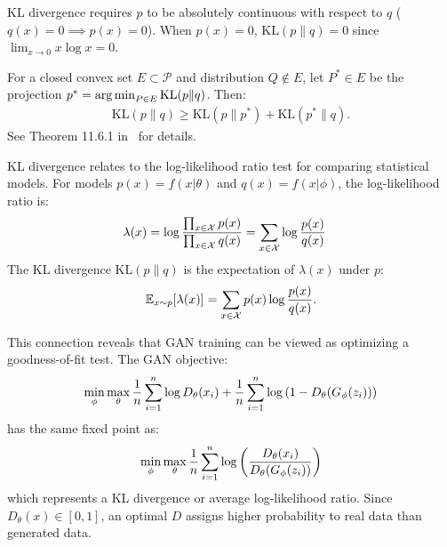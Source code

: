 \begin{remark}
  KL divergence requires $p$ to be absolutely continuous with respect to $q$ ($q(x) = 0 \implies p(x) = 0$). When $p(x) = 0$, $\text{KL}(p \| q) = 0$ since $\lim_{x \to 0} x\log{x} = 0$.
\end{remark}

\begin{theorem}
  For a closed convex set $E \subset \mathcal{P}$ and distribution $Q \not \in E$, let $P^* \in E$ be the projection $p^* = \operatorname*{arg\,min}_{P \in E} \text{KL}(p \| q)$. Then:
  \begin{align}
   \text{KL}(p \| q) \geq \text{KL}(p \| p^*) + \text{KL}(p^* \| q).
  \end{align}
  See Theorem 11.6.1 in~\cite{ref:cover-thomas} for details.
\end{theorem}

\begin{remark}
  KL divergence relates to the log-likelihood ratio test for comparing statistical models. For models $p(x) = f(x|\theta)$ and $q(x) = f(x|\phi)$, the log-likelihood ratio is:
  \begin{align}
    \lambda(x) & = \log{\prod_{x \in \mathcal{X}} p(x) \over \prod_{x \in \mathcal{X}} q(x)} = \sum_{x \in \mathcal{X}} \log {p(x) \over q(x)}
  \end{align}
  The KL divergence $\text{KL}(p \| q)$ is the expectation of $\lambda(x)$ under $p$:
  \begin{align}
    \mathbb{E}_{x \sim p}[\lambda(x)] = \sum_{x \in \mathcal{X}} p(x)\log {p(x) \over q(x)}.
  \end{align}
\end{remark}

This connection reveals that GAN training can be viewed as optimizing a goodness-of-fit test. The GAN objective:
\begin{align}
  \min_\phi\max_\theta{1 \over n} \sum_{i=1}^n \log{D_\theta(x_i)} + {1 \over n} \sum_{i=1}^n\log{(1 - D_\theta(G_\phi(z_i)))}
\end{align}
has the same fixed point as:
\begin{align}
  \min_\phi\max_\theta{1 \over n} \sum_{i=1}^n \log{\left({D_\theta(x_i) \over D_\theta(G_\phi(z_i))}\right)}
\end{align}
which represents a KL divergence or average log-likelihood ratio. Since $D_\theta(x) \in [0, 1]$, an optimal $D$ assigns higher probability to real data than generated data.

